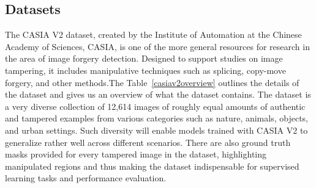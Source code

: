 \documentclass{ieeeaccess}
\begin{document}
\subsection{Datasets}
	The CASIA V2 dataset, created by the Institute of Automation at the Chinese Academy of Sciences, CASIA, is one of the more general resources for research in the area of image forgery detection. Designed to support studies on image tampering, it includes manipulative techniques such as splicing, copy-move forgery, and other methods.The Table~\ref{casiav2overview} outlines the details of the dataset and gives us an overview of what the dataset contains. The dataset is a very diverse collection of 12,614 images of roughly equal amounts of authentic and tampered examples from various categories such as nature, animals, objects, and urban settings. Such diversity will enable models trained with CASIA V2 to generalize rather well across different scenarios. There are also ground truth masks provided for every tampered image in the dataset, highlighting manipulated regions and thus making the dataset indispensable for supervised learning tasks and performance evaluation.
\end{document}
